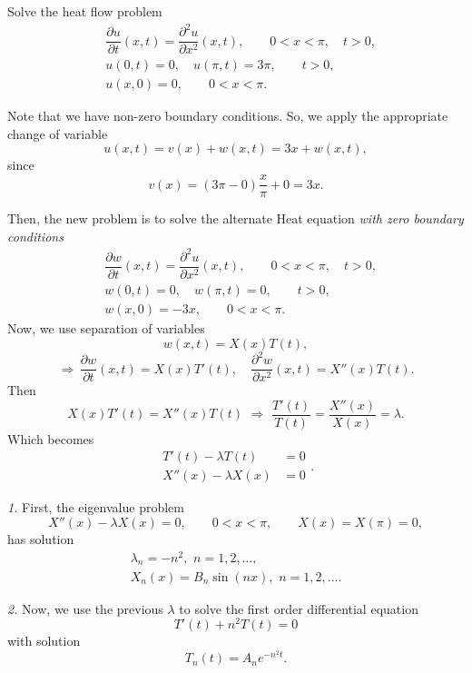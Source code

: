 \documentclass[11pt]{article}
\begin{document}
\begin{problem}
Solve the heat flow problem
\begin{equation*} \begin{split}
& \dfrac{\partial u }{\partial t } (x,t) = \dfrac{\partial^2 u}{\partial x^2}(x,t), \qquad 0<x<\pi, \quad t>0, \\
& u(0,t) = 0, \quad u(\pi,t)= 3\pi, \qquad t>0, \\
& u(x,0) = 0, \qquad 0<x<\pi.
\end{split}\end{equation*}
\end{problem}

\begin{solution}
Note that we have non-zero boundary conditions. So, we apply the appropriate change of variable
\[u(x,t)=v(x)+w(x, t)=3x + w(x,t),\]
since
\[v(x)=(3\pi-0)\frac{x}{\pi}+0=3x.\]

Then, the new problem is to solve the alternate Heat equation \textsl{with zero boundary conditions}
\begin{equation*} \begin{split}
& \dfrac{\partial w }{\partial t } (x,t) = \dfrac{\partial^2 u}{\partial x^2}(x,t), \qquad 0<x<\pi, \quad t>0, \\
& w(0,t) = 0, \quad w(\pi,t)= 0, \qquad t>0, \\
& w(x,0) = -3x, \qquad 0<x<\pi.
\end{split}\end{equation*}
Now, we use separation of variables
\[w(x,t)=X(x)T(t),\]
\[\Rightarrow\, \frac{\partial w}{\partial t}(x,t)=X(x)T'(t),\quad \frac{\partial^{2} w}{\partial x^{2}}(x,t)=X''(x)T(t).\]
Then 
\[X(x)T'(t)=X''(x)T(t) \,\,\Rightarrow\,\, \frac{T'(t)}{T(t)}=\frac{X''(x)}{X(x)}=\lambda.\]
Which becomes
\[\begin{split}T'(t)-\lambda T(t)&=0 \\ X''(x)-\lambda X(x)&=0 \end{split}.\]

\textsl{1. } First, the eigenvalue problem
\[X''(x)-\lambda X(x)=0, \qquad 0<x<\pi, \qquad  X(x)=X(\pi)=0,\]
has solution 
\[\begin{split}
  \lambda_{n}=-n^{2}, \,\, n=1, 2, \dots, \\
  \boxed{X_{n}(x)=B_{n}\sin(nx)}, \,\, n=1, 2, \dots.
  \end{split}
\]

\textsl{2. } Now, we use the previous $\lambda$ to solve the first order differential equation
\[T'(t) + n^{2} T(t)=0\]
with solution
\[\boxed{T_{n}(t)=A_{n}e^{-n^{2}t}}.\]


\end{solution}
\end{document}
